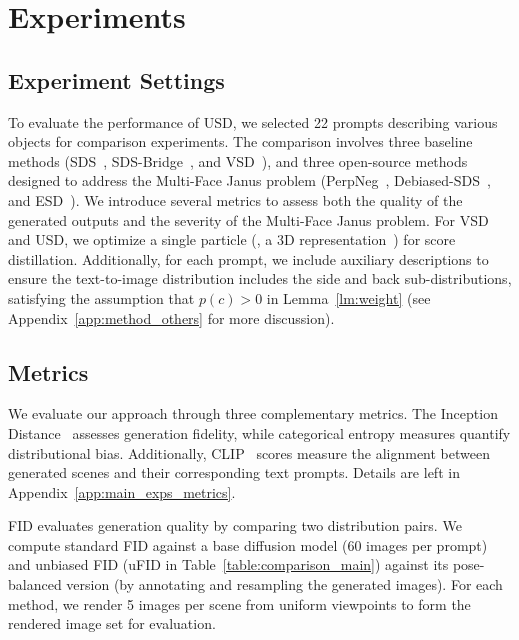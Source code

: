 
\section{Experiments} \label{sec:experiment}

\subsection{Experiment Settings}\label{sec:exp_settings}


To evaluate the performance of USD, we selected 22 prompts describing various objects for comparison experiments. The comparison involves three baseline methods (SDS~\citep{poole2022dreamfusion}, SDS-Bridge~\citep{mcallister2024rethinking}, and VSD~\citep{wang2024prolificdreamer}), and three open-source methods designed to address the Multi-Face Janus problem (PerpNeg~\citep{armandpour2023re}, Debiased-SDS~\citep{hong2023debiasing}, and ESD~\citep{wang2024taming}). We introduce several metrics to assess both the quality of the generated outputs and the severity of the Multi-Face Janus problem. For VSD and USD, we optimize a single particle (\ie, a 3D representation~\citep{mildenhall2021nerf, muller2022instant}) for score distillation. Additionally, for each prompt, we include auxiliary descriptions to ensure the text-to-image distribution includes the side and back sub-distributions, satisfying the assumption that $p(c) > 0$ in Lemma~\ref{lm:weight} (see Appendix~\ref{app:method_others} for more discussion).



\subsection{Metrics} 
We evaluate our approach through three complementary metrics. The  Inception Distance~\citep{heusel2017gans} assesses generation fidelity, while categorical entropy measures quantify distributional bias. Additionally, CLIP~\citep{radford2021learning} scores measure the alignment between generated scenes and their corresponding text prompts. Details are left in Appendix~\ref{app:main_exps_metrics}.

\textbf{} FID evaluates generation quality by comparing two distribution pairs. We compute standard FID against a base diffusion model (60 images per prompt) and unbiased FID (uFID in Table~\ref{table:comparison_main}) against its pose-balanced version (by annotating and resampling the generated images). For each method, we render 5 images per scene from uniform viewpoints to form the rendered image set for evaluation.



